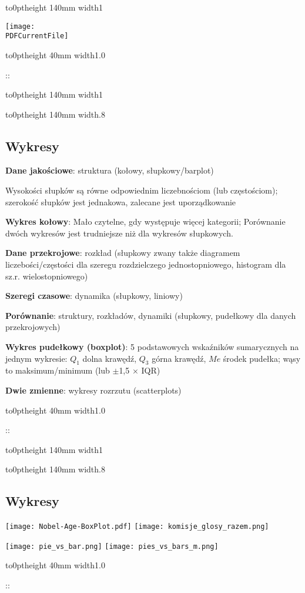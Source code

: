 \documentclass{article}
\def \PDFCurrentFile{stat_w_03.pdf}
\newenvironment{slide}[1]{%
  {\color{green}\vbox to0pt{\noindent \vrule height 140mm width1\textwidth\vss}}
  \vspace{3mm}%
\noindent%
\begin{minipage}{.9\textwidth}
\texttt{[image: \\PDFCurrentFile]}
\end{minipage}%
\par
{\color{orange}\vbox to0pt{\noindent \vrule height 40mm width1.0\textwidth\vss}}
\begin{minipage}{.9\textwidth}
  \thepage::\par
}{\end{minipage}\par
\clearpage}
\newenvironment{xslide}[2]{%
  {\color{green}\vbox to0pt{\noindent \vrule height 140mm width1\textwidth\vss}}
  \vspace{3mm}%
\noindent%
\begin{minipage}{.9\textwidth}#1
\end{minipage}%
\par
{\color{orange}\vbox to0pt{\noindent \vrule height 40mm width1.0\textwidth\vss}}
\begin{minipage}{.9\textwidth}#2
  \thepage::\par
}{\end{minipage}\par
\clearpage}
\begin{document}
\begin{slide}{26}
\end{slide}

\begin{xslide}{
    {\color{white}\vbox to0pt{\noindent \vrule height 140mm width.8\textwidth\vss}}
    \begin{minipage}{.8\textwidth}
  \subsection*{Wykresy}
  \begin{raggedright}
  \textbf{Dane jakościowe}: struktura (kołowy, słupkowy/barplot)

  Wysokości słupków są równe odpowiednim liczebnościom (lub częstościom); szerokość słupków jest jednakowa, zalecane jest uporządkowanie

  \textbf{Wykres kołowy}: Mało czytelne, gdy występuje więcej kategorii;
  Porównanie dwóch wykresów jest trudniejsze niż dla wykresów słupkowych.

  \medskip
  
  \textbf{Dane przekrojowe}: rozkład (słupkowy zwany także diagramem liczebości/częstości dla szeregu rozdzielczego jednostopniowego,
  histogram dla sz.r. wielostopniowego)

  \medskip
  
  \textbf{Szeregi czasowe}: dynamika (słupkowy, liniowy)

  \medskip
  
  \textbf{Porównanie}: struktury, rozkładów, dynamiki (słupkowy, pudełkowy dla danych przekrojowych)

  \medskip
  
  \textbf{Wykres pudełkowy (boxplot)}: 5 podstawowych wskaźników
  sumarycznych na jednym wykresie: $Q_1$ dolna krawędź, $Q_3$ górna
  krawędź, $Me$ środek pudełka; wąsy to maksimum/minimum (lub $\pm$1,5
  $\times$ IQR)
  
  \textbf{Dwie zmienne}: wykresy rozrzutu (scatterplots)
  \end{raggedright}
  \vspace{22mm}
  \end{minipage}
  }{}
\end{xslide}

\begin{xslide}{
    {\color{white}\vbox to0pt{\noindent \vrule height 140mm width.8\textwidth\vss}}
    \begin{minipage}{.8\textwidth}
  \subsection*{Wykresy}

  \texttt{[image: Nobel-Age-BoxPlot.pdf]}
  \texttt{[image: komisje\_glosy\_razem.png]}

  \kern-4mm
  
  \texttt{[image: pie\_vs\_bar.png]}
    \texttt{[image: pies\_vs\_bars\_m.png]}
  
  \end{minipage}
  }{}
\end{xslide}  
  
\end{document}
